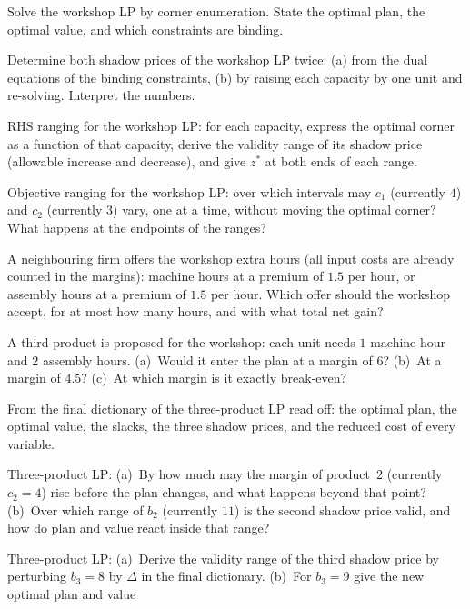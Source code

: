 \begin{problems}
  \item Solve the workshop LP by corner enumeration. State the optimal
        plan, the optimal value, and which constraints are binding.
  \item Determine both shadow prices of the workshop LP twice: (a) from
        the dual equations of the binding constraints, (b) by raising each
        capacity by one unit and re-solving. Interpret the numbers.
  \item RHS ranging for the workshop LP: for each capacity, express the
        optimal corner as a function of that capacity, derive the validity
        range of its shadow price (allowable increase and decrease), and
        give $z^{*}$ at both ends of each range.
  \item Objective ranging for the workshop LP: over which intervals may
        $c_{1}$ (currently $4$) and $c_{2}$ (currently $3$) vary, one at a
        time, without moving the optimal corner? What happens at the
        endpoints of the ranges?
  \item A neighbouring firm offers the workshop extra hours (all input
        costs are already counted in the margins): machine hours at a
        premium of $1.5$ per hour, or assembly hours at a premium of
        $1.5$ per hour. Which offer should the workshop accept, for at
        most how many hours, and with what total net gain?
  \item A third product is proposed for the workshop: each unit needs
        $1$ machine hour and $2$ assembly hours. (a)~Would it enter the
        plan at a margin of $6$? (b)~At a margin of $4.5$? (c)~At which
        margin is it exactly break-even?
  \item From the final dictionary of the three-product LP read off: the
        optimal plan, the optimal value, the slacks, the three shadow
        prices, and the reduced cost of every variable.
  \item Three-product LP: (a)~By how much may the margin of product~2
        (currently $c_{2}=4$) rise before the plan changes, and what
        happens beyond that point? (b)~Over which range of $b_{2}$
        (currently $11$) is the second shadow price valid, and how do
        plan and value react inside that range?
  \item Three-product LP: (a)~Derive the validity range of the third
        shadow price by perturbing $b_{3}=8$ by $\Delta$ in the final
        dictionary. (b)~For $b_{3}=9$ give the new optimal plan and value

\end{problems}
